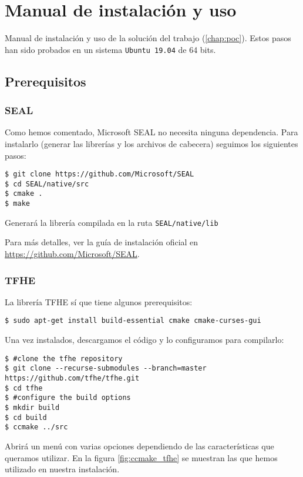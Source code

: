 \chapter{Manual de instalación y uso}
\label{appendix:manual}

Manual de instalación y uso de la solución del trabajo (\ref{chap:poc}). Estos pasos han sido probados en un sistema \verb|Ubuntu 19.04| de 64 bits.

\section{Prerequisitos}

\subsection{SEAL}

Como hemos comentado, Microsoft SEAL no necesita ninguna dependencia. Para instalarlo (generar las librerías y los archivos de cabecera) seguimos los siguientes pasos:

\begin{verbatim}
$ git clone https://github.com/Microsoft/SEAL
$ cd SEAL/native/src
$ cmake .
$ make
\end{verbatim}

Generará la librería compilada en la ruta \verb|SEAL/native/lib|

Para más detalles, ver la guía de instalación oficial en \url{https://github.com/Microsoft/SEAL}.

\subsection{TFHE}

La librería TFHE sí que tiene algunos prerequisitos:

\begin{verbatim}
$ sudo apt-get install build-essential cmake cmake-curses-gui
\end{verbatim}

Una vez instalados, descargamos el código y lo configuramos para compilarlo:

\begin{verbatim}
$ #clone the tfhe repository
$ git clone --recurse-submodules --branch=master https://github.com/tfhe/tfhe.git
$ cd tfhe
$ #configure the build options
$ mkdir build
$ cd build
$ ccmake ../src
\end{verbatim}

Abrirá un menú con varias opciones dependiendo de las características que queramos utilizar. En la figura \ref{fig:ccmake_tfhe} se muestran las que hemos utilizado en nuestra instalación.

